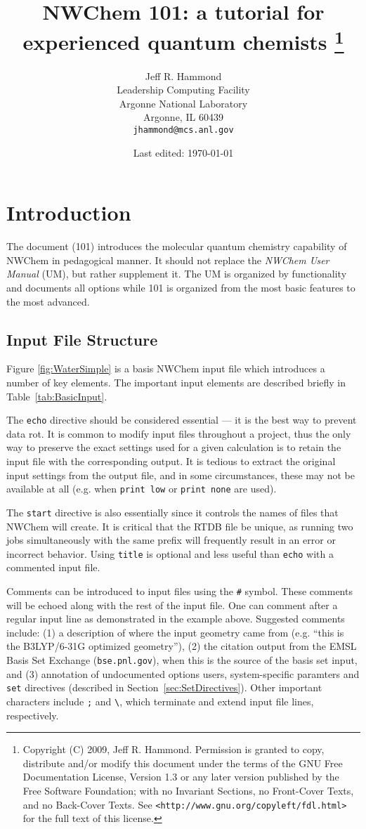 \documentclass[letterpaper,12pt]{article}
\title{NWChem 101: a tutorial for experienced quantum chemists
       \footnote{
Copyright (C) 2009, Jeff R. Hammond. Permission is granted to copy, distribute and/or modify this document under the terms of the GNU Free Documentation License, Version 1.3 or any later version published by the Free Software Foundation; with no Invariant Sections, no Front-Cover Texts, and no Back-Cover Texts. See \texttt{<http://www.gnu.org/copyleft/fdl.html>} for the full text of this license.
       }
}
\author{Jeff R. Hammond \\
        Leadership Computing Facility \\
        Argonne National Laboratory \\
        Argonne, IL 60439 \\
        \texttt{jhammond@mcs.anl.gov}}
\date{Last edited: \today}
\begin{document}
\maketitle

% 

\section{Introduction}\label{sec:Introduction}

The document (101) introduces the molecular quantum chemistry capability of NWChem in pedagogical manner.  It should not replace the \textit{NWChem User Manual} (UM), but rather supplement it.  The UM is organized by functionality and documents all options while 101 is organized from the most basic features to the most advanced.

\newpage

\subsection{Input File Structure}\label{sec:InputFileStructure}

Figure \ref{fig:WaterSimple} is a basis NWChem input file which introduces a number of key elements.  The important input elements are described briefly in Table~\ref{tab:BasicInput}.

The \texttt{echo} directive should be considered essential --- it is the best way to prevent data rot.  It is common to modify input files throughout a project, thus the only way to preserve the exact settings used for a given calculation is to retain the input file with the corresponding output.  It is tedious to extract the original input settings from the output file, and in some circumstances, these may not be available at all (e.g. when \texttt{print low} or \texttt{print none} are used).

The \texttt{start} directive is also essentially since it controls the names of files that NWChem will create.  It is critical that the RTDB file be unique, as running two jobs simultaneously with the same prefix will frequently result in an error or incorrect behavior.  Using \texttt{title} is optional and less useful than \texttt{echo} with a commented input file.

Comments can be introduced to input files using the \texttt{\#} symbol.  These comments will be echoed along with the rest of the input file.  One can comment after a regular input line as demonstrated in the example above.  Suggested comments include: (1) a description of where the input geometry came from (e.g. ``this is the B3LYP/6-31G optimized geometry''), (2) the citation output from the EMSL Basis Set Exchange (\texttt{bse.pnl.gov}), when this is the source of the basis set input, and (3) annotation of undocumented options users, system-specific paramters and \texttt{set} directives (described in Section~\ref{sec:SetDirectives}).  Other important characters include \verb";" and \verb"\", which terminate and extend input file lines, respectively.
\end{document}
